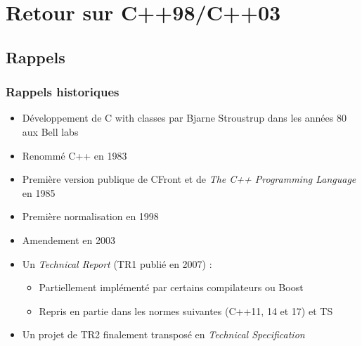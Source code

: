 \documentclass[C++.tex]{subfiles}
\begin{document}
\section{Retour sur C++98/C++03}
\subsection*{Rappels}
\begin{frame}
	\frametitle{Rappels historiques}
	\begin{itemize}
		\item Développement de \og C with classes\fg{} par Bjarne Stroustrup dans les années 80 aux Bell labs
		\item Renommé C++ en 1983
		\item Première version publique de CFront et de \textit{The C++ Programming Language} en 1985
		\item Première normalisation en 1998
		\item Amendement en 2003
		\item Un \textit{Technical Report} (TR1 publié en 2007) :
		
		
		\begin{itemize}
			\item Partiellement implémenté par certains compilateurs ou Boost
			\item Repris en partie dans les normes suivantes (C++11, 14 et 17) et TS
			
			
		\end{itemize}
		\item Un projet de TR2 finalement transposé en \textit{Technical Specification}
		
	\end{itemize}
\end{frame}
\end{document}
